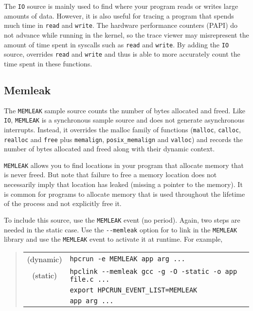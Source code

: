 The \verb|IO| source is mainly used to find where your program reads or
writes large amounts of data.  However, it is also useful for tracing
a program that spends much time in \verb|read| and \verb|write|.  The
hardware performance counters (PAPI) do not advance while running in
the kernel, so the trace viewer may misrepresent the amount of time
spent in syscalls such as \verb|read| and \verb|write|.  By adding the
\verb|IO| source, \hpcrun{} overrides \verb|read| and \verb|write| and
thus is able to more accurately count the time spent in these
functions.

\subsection{Memleak}

The \verb|MEMLEAK| sample source counts the number of bytes allocated
and freed.  Like \verb|IO|, \verb|MEMLEAK| is a synchronous sample
source and does not generate asynchronous interrupts.  Instead, it
overrides the malloc family of functions (\verb|malloc|, \verb|calloc|,
\verb|realloc| and \verb|free| plus \verb|memalign|, \verb|posix_memalign|
and \verb|valloc|) and records the number of bytes
allocated and freed along with their dynamic context.

\verb|MEMLEAK| allows you to find locations in your program that
allocate memory that is never freed.  But note that failure to free a
memory location does not necessarily imply that location has leaked
(missing a pointer to the memory).  It is common for programs to
allocate memory that is used throughout the lifetime of the process
and not explicitly free it.

To include this source, use the \verb|MEMLEAK| event (no period).
Again, two steps are needed in the static case.  Use the \verb|--memleak|
option for \hpclink{} to link in the \verb|MEMLEAK| library
and use the \verb|MEMLEAK| event to activate it at runtime.  For
example,

\begin{quote}
\begin{tabular}{@{}cl}
(dynamic) & \verb|hpcrun -e MEMLEAK app arg ...| \\
(static)  & \verb|hpclink --memleak gcc -g -O -static -o app file.c ...| \\
& \verb|export HPCRUN_EVENT_LIST=MEMLEAK| \\
& \verb|app arg ...|
\end{tabular}
\end{quote}


